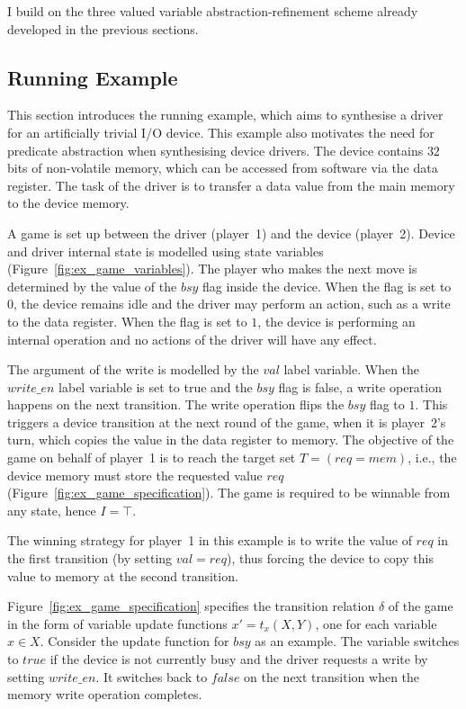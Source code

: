 I build on the three valued variable abstraction-refinement scheme already developed in the previous sections. 

\subsection{Running Example}

This section introduces the running example, which aims to synthesise a driver for an artificially trivial I/O device. This example also motivates the need for predicate abstraction when synthesising device drivers. The device contains $32$ bits of non-volatile memory, which can be accessed from software via the data register. The task of the driver is to transfer a data value from the main memory to the device memory.

A game is set up between the driver (player~1) and the device (player~2).  Device and driver internal state is modelled using state variables (Figure~\ref{fig:ex_game_variables}).  The player who makes the next move is determined by the value of the $bsy$ flag inside the device.  When the flag is set to $0$, the device remains idle and the driver may perform an action, such as a write to the data register.  When the flag is set to $1$, the device is performing an internal operation and no actions of the driver will have any effect. 

The argument of the write is modelled by the $val$ label variable. When the $write\_en$ label variable is set to true and the $bsy$ flag is false, a write operation happens on the next transition. The write operation flips the $bsy$ flag to $1$.  This triggers a device transition at the next round of the game, when it is player~2's turn, which copies the value in the data register to memory.  The objective of the game on behalf of player~1 is to reach the target set $T=(req=mem)$, i.e., the device memory must store the requested value $req$ (Figure~\ref{fig:ex_game_specification}). The game is required to be winnable from any state, hence $I=\top$.  

The winning strategy for player~1 in this example is to write the value of $req$ in the first transition (by setting $val=req$), thus forcing the device to copy this value to memory at the second transition.

Figure~\ref{fig:ex_game_specification} specifies the transition relation $\delta$ of the game in the form of variable update functions $x' = t_x(X,Y)$, one for each variable $x\in X$.  Consider the update function for $bsy$ as an example.  The variable switches to $true$ if the device is not currently busy and the driver requests a write by setting $write\_en$. It switches back to $false$ on the next transition when the memory write operation completes.

